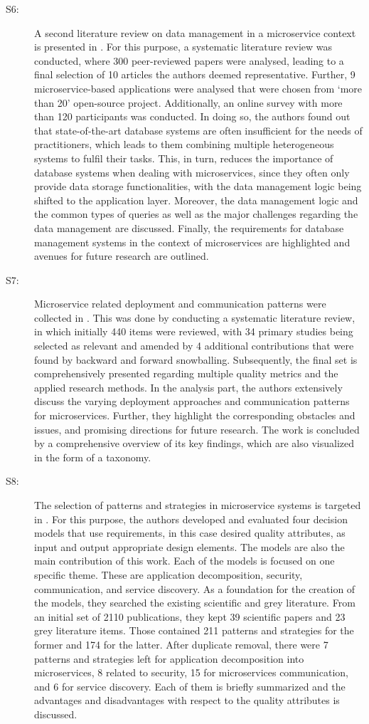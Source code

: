 \documentclass{bmcart}
\begin{document}
\begin{description}
  \item[S6:] A second literature review on data management in a microservice context is presented in \cite{Laigner.2021}. For this purpose, a systematic literature review was conducted, where 300 peer-reviewed papers were analysed, leading to a final selection of 10 articles the authors deemed representative. Further, 9 microservice-based applications were analysed that were chosen from `more than 20' \cite{Laigner.2021} open-source project. Additionally, an online survey with more than 120 participants was conducted. In doing so, the authors found out that state-of-the-art database systems are often insufficient for the needs of practitioners, which leads to them combining multiple heterogeneous systems to fulfil their tasks. This, in turn, reduces the importance of database systems when dealing with microservices, since they often only provide data storage functionalities, with the data management logic being shifted to the application layer. Moreover, the data management logic and the common types of queries as well as the major challenges regarding the data management are discussed. Finally, the requirements for database management systems in the context of microservices are highlighted and avenues for future research are outlined.
  \item[S7:] Microservice related deployment and communication patterns were collected in \cite{aksakalli2021deployment}. This was done by conducting a systematic literature review, in which initially 440 items were reviewed, with 34 primary studies being selected as relevant and amended by 4 additional contributions that were found by backward and forward snowballing. Subsequently, the final set is comprehensively presented regarding multiple quality metrics and the applied research methods. In the analysis part, the authors extensively discuss the varying deployment approaches and communication patterns for microservices. Further, they highlight the corresponding obstacles and issues, and promising directions for future research. The work is concluded by a comprehensive overview of its key findings, which are also visualized in the form of a taxonomy. 
  \item[S8:] The selection of patterns and strategies in microservice systems is targeted in \cite{Waseem.2022}. For this purpose, the authors developed and evaluated four decision models that use requirements, in this case desired quality attributes, as input and output appropriate design elements. The models are also the main contribution of this work. Each of the models is focused on one specific theme. These are application decomposition, security, communication, and service discovery. As a foundation for the creation of the models, they searched the existing scientific and grey literature. From an initial set of 2110 publications, they kept 39 scientific papers and 23 grey literature items. Those contained 211 patterns and strategies for the former and 174 for the latter. After duplicate removal, there were 7 patterns and strategies left for application decomposition into microservices, 8 related to security, 15 for microservices communication, and 6 for service discovery. Each of them is briefly summarized and the advantages and disadvantages with respect to the quality attributes is discussed.

\end{description}
\end{document}
